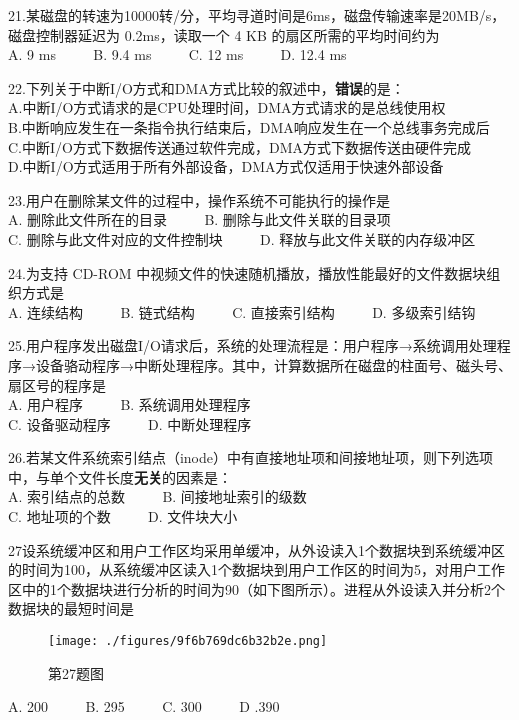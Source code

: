 21.某磁盘的转速为10000转/分，平均寻道时间是6ms，磁盘传输速率是20MB/s，磁盘控制器延迟为 0.2ms，读取一个 4 KB 的扇区所需的平均时间约为 \\
A. 9 ms $\qquad$ B. 9.4 ms $\qquad$ C. 12 ms $\qquad$ D. 12.4 ms

22.下列关于中断I/O方式和DMA方式比较的叙述中，\textbf{错误}的是： \\
A.中断I/O方式请求的是CPU处理时间，DMA方式请求的是总线使用权 \\
B.中断响应发生在一条指令执行结束后，DMA响应发生在一个总线事务完成后 \\
C.中断I/O方式下数据传送通过软件完成，DMA方式下数据传送由硬件完成 \\
D.中断I/O方式适用于所有外部设备，DMA方式仅适用于快速外部设备

23.用户在删除某文件的过程中，操作系统不可能执行的操作是 \\
A. 删除此文件所在的目录 $\qquad$ B. 删除与此文件关联的目录项 \\
C. 删除与此文件对应的文件控制块 $\qquad$ D. 释放与此文件关联的内存级冲区

24.为支持 CD-ROM 中视频文件的快速随机播放，播放性能最好的文件数据块组织方式是 \\
A. 连续结构 $\qquad$ B. 链式结构 $\qquad$ C. 直接索引结构 $\qquad$ D. 多级索引结钩

25.用户程序发出磁盘I/O请求后，系统的处理流程是：用户程序→系统调用处理程序→设备骆动程序→中断处理程序。其中，计算数据所在磁盘的柱面号、磁头号、扇区号的程序是 \\
A. 用户程序 $\qquad$ B. 系统调用处理程序 \\
C. 设备驱动程序 $\qquad$ D. 中断处理程序

26.若某文件系统索引结点（inode）中有直接地址项和间接地址项，则下列选项中，与单个文件长度\textbf{无关}的因素是： \\
A. 索引结点的总数 $\qquad$ B. 间接地址索引的级数 \\
C. 地址项的个数 $\qquad$ D. 文件块大小

27设系统缓冲区和用户工作区均采用单缓冲，从外设读入1个数据块到系统缓冲区的时间为100，从系统缓冲区读入1个数据块到用户工作区的时间为5，对用户工作区中的1个数据块进行分析的时间为90（如下图所示）。进程从外设读入并分析2个数据块的最短时间是 \\
\begin{figure}[ht]
\centering
\texttt{[image: ./figures/9f6b769dc6b32b2e.png]}
\caption{第27题图} \label{fig_CSN13_3}
\end{figure}
A. 200 $\qquad$ B. 295 $\qquad$ C. 300 $\qquad$ D .390

